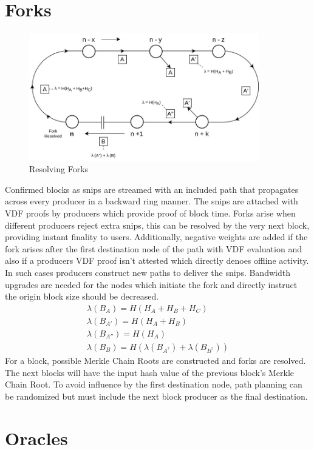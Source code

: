 \documentclass[a4paper,10pt]{article}
\begin{document}
\section{Forks}
\begin{figure}[H]
\begin{center}
\includegraphics[width=10cm]{fork}
\caption{Resolving Forks}
\end{center}
\end{figure}
Confirmed blocks as snips are streamed with an included path that propagates across every producer in a backward ring manner. The snips are attached with VDF proofs by producers which provide proof of block time. Forks arise when different producers reject extra snips, this can be resolved by the very next block, providing instant finality to users. Additionally, negative weights are added if the fork arises after the first destination node of the path with VDF evaluation and also if a producers VDF proof isn't attested which directly denoes offline activity. In such cases producers construct new paths to deliver the snips. Bandwidth upgrades are needed for the nodes which initiate the fork and directly instruct the origin block size should be decreased.
\begin{align}
\lambda (B_A) = H(H_A+H_B+H_C) \\
\lambda (B_{A'}) = H(H_A+H_B)\\
\lambda (B_{A''}) = H(H_A)  \\
\lambda (B_{B}) = H(\lambda(B_{A^?}) + \lambda(B_{B^?}))
\end{align}
For a block, possible Merkle Chain Roots are constructed and forks are resolved. The next blocks will have the input hash value of the previous block's Merkle Chain Root. To avoid influence by the first destination node, path planning can be randomized but must include the next block producer as the final destination.
\section{Oracles}
\end{document}
